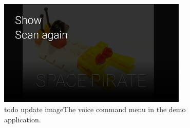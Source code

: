 	\begin{figure}[ht!]
		\centering
		\includegraphics[width=90mm]{images/demo/voiceCommand1}
		\caption{todo update imageThe voice command menu in the demo application.}
		\label{glassDemoVoiceCommand}
	\end{figure}


